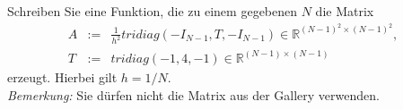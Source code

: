 \begin{aufg}[0]
Schreiben Sie eine Funktion, die zu einem gegebenen $N$ die Matrix 
\begin{eqnarray*} 
A & := & \frac{1}{h^2} tridiag(-I_{N-1}, T, -I_{N-1}) \in \mathbb{R}^{(N-1)^2
 \times (N-1)^2},\\
 T & := & tridiag(-1,4,-1) \in \mathbb{R}^{(N-1)\times (N-1)} 
\end{eqnarray*}
erzeugt. Hierbei gilt $h=1/N$.\\

{\it Bemerkung: } Sie d\"urfen nicht die Matrix aus der Gallery verwenden.
\end{aufg}